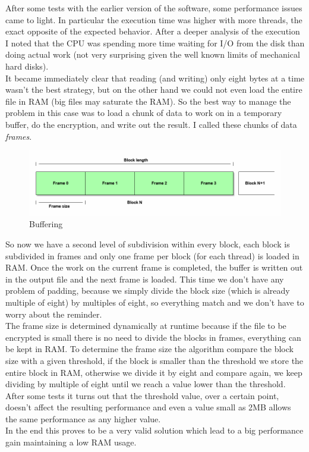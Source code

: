After some tests with the earlier version of the software, some performance issues came to light. In particular the execution time was higher with more threads, the exact opposite of the expected behavior. After a deeper analysis of the execution I noted that the CPU was spending more time waiting for I/O from the disk than doing actual work (not very surprising given the well known limits of mechanical hard disks).\\
It became immediately clear that reading (and writing) only eight bytes at a time wasn't the best strategy, but on the other hand we could not even load the entire file in RAM (big files may saturate the RAM). So the best way to manage the problem in this case was to load a chunk of data to work on in a temporary buffer, do the encryption, and write out the result. I called these chunks of data \emph{frames}.

\begin{figure}[H]
\centering
\includegraphics[scale = 0.4]{./Pictures/buffering} %
\caption{Buffering}
\label{fig:buffering}
\end{figure}

So now we have a second level of subdivision within every block, each block is subdivided in frames and only one frame per block (for each thread) is loaded in RAM. Once the work on the current frame is completed, the buffer is written out in the output file and the next frame is loaded. This time we don't have any problem of padding, because we simply divide the block size (which is already multiple of eight) by multiples of eight, so everything match and we don't have to worry about the reminder.\\
The frame size is determined dynamically at runtime because if the file to be encrypted is small there is no need to divide the blocks in frames, everything can be kept in RAM. To determine the frame size the algorithm compare the block size with a given threshold, if the block is smaller than the threshold we store the entire block in RAM, otherwise we divide it by eight and compare again, we keep dividing by multiple of eight until we reach a value lower than the threshold.\\
After some tests it turns out that the threshold value, over a certain point, doesn't affect the resulting performance and even a value small as 2MB allows the same performance as any higher value.\\
In the end this proves to be a very valid solution which lead to a big performance gain maintaining a low RAM usage.